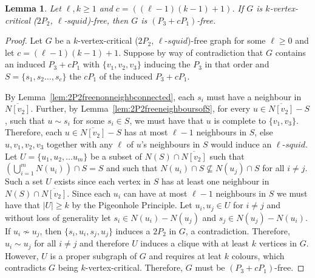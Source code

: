 \documentclass[11pt]{article}
\newtheorem{lemma}[theorem]{Lemma}
\theoremstyle{definition}
\newcommand{\squid}[1]{$#1$-$squid$}
\begin{document}
\begin{lemma}\label{lem:2P2ellsquidP3cP1fee}
Let $\ell,k\ge 1$ and $c=((\ell-1)(k-1)+1)$. If $G$ is $k$-vertex-critical ($2P_2$, \squid{\ell})-free, then $G$ is $(P_3+ cP_1)$-free.
\end{lemma}
\begin{proof}
Let $G$ be a $k$-vertex-critical ($2P_2$, \squid{\ell})-free graph for some $\ell\ge 0$ and let $c=(\ell-1)(k-1)+1$. Suppose by way of contradiction that $G$ contains an induced $P_3+c P_1$ with $\{v_1,v_2,v_3\}$ inducing the $P_3$ in that order and $S=\{s_1,s_2\dots, s_c\}$ the $c P_1$ of the induced $P_3+c P_1$. 

By Lemma~\ref{lem:2P2freenonneighbconnected}, each $s_i$ must have a neighbour in $\overline{N[v_2]}$. Further, by Lemma~\ref{lem:2P2freeneighboursofS}, for every $u\in \overline{N[v_2]}-S$, such that $u\sim s_i$ for some $s_i\in S$, we must have that $u$ is complete to $\{v_1,v_3\}$. Therefore, each $u\in \overline{N[v_2]}-S$  has at most $\ell-1$ neighbours in $S$, else $u,v_1,v_2,v_3$ together with any $\ell$ of $u$'s neighbours in $S$ would induce an \squid{\ell}. Let $U=\{u_1,u_2,\dots u_m\}$ be a subset of $N(S)\cap \overline{N[v_2]}$ such that $\left(\bigcup_{i=1}^{m} N(u_i)\right)\cap S = S$ and such that $N(u_i)\cap S\not\subseteq N(u_j)\cap S$ for all $i\neq j$. Such a set $U$ exists since each vertex in $S$ has at least one neighbour in $N(S)\cap \overline{N[v_2]}$. %
Since each $u_i$ can have at most $\ell-1$ neighbours in $S$ we must have that $|U|\ge k$ by the Pigeonhole Principle. Let $u_i,u_j\in U$ for $i\neq j$ and without loss of generality let $s_i\in N(u_i)-N(u_j)$ and $s_j\in N(u_j)-N(u_i)$. If $u_i\nsim u_j$, then $\{s_i,u_i,s_j,u_j\}$ induces a $2P_2$ in $G$, a contradiction. Therefore, $u_i\sim u_j$ for all $i\neq j$ and therefore $U$ induces a clique with at least $k$ vertices in $G$. However, $U$ is a proper subgraph of $G$ and requires at leat $k$ colours, which contradicts $G$ being $k$-vertex-critical. Therefore, $G$ must be $(P_3+ cP_1)$-free.
\end{proof}
\end{document}
